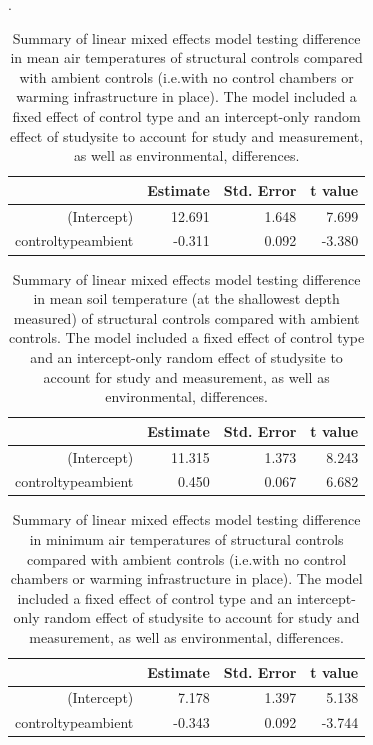 \documentclass{article}
\begin{document}
.
\par 
\begin{table}[ht]
\centering
\begin{tabular}{rrrr}
  \hline
 & Estimate & Std. Error & t value \\ 
  \hline
(Intercept) & 12.691 & 1.648 & 7.699 \\ 
  controltypeambient & -0.311 & 0.092 & -3.380 \\ 
   \hline
\end{tabular}
\caption{Summary of linear mixed effects model testing difference in mean air temperatures of structural controls compared with ambient controls (i.e.with no control chambers or warming infrastructure in place). The model included a fixed effect of control type and an intercept-only random effect of studysite to account for study and measurement, as well as environmental, differences.} 
\end{table}
\par
\begin{table}[ht]
\centering
\begin{tabular}{rrrr}
  \hline
 & Estimate & Std. Error & t value \\ 
  \hline
(Intercept) & 11.315 & 1.373 & 8.243 \\ 
  controltypeambient & 0.450 & 0.067 & 6.682 \\ 
   \hline
\end{tabular}
\caption{Summary of linear mixed effects model testing difference in mean soil temperature (at the shallowest depth measured) of structural controls compared with ambient controls. The model included a fixed effect of control type and an intercept-only random effect of studysite to account for study and measurement, as well as environmental, differences.} 
\end{table}
\par
\begin{table}[ht]
\centering
\begin{tabular}{rrrr}
  \hline
 & Estimate & Std. Error & t value \\ 
  \hline
(Intercept) & 7.178 & 1.397 & 5.138 \\ 
  controltypeambient & -0.343 & 0.092 & -3.744 \\ 
   \hline
\end{tabular}
\caption{Summary of linear mixed effects model testing difference in minimum air temperatures of structural controls compared with ambient controls (i.e.with no control chambers or warming infrastructure in place). The model included a fixed effect of control type and an intercept-only random effect of studysite to account for study and measurement, as well as environmental, differences.} 
\end{table}\par
\end{document}
